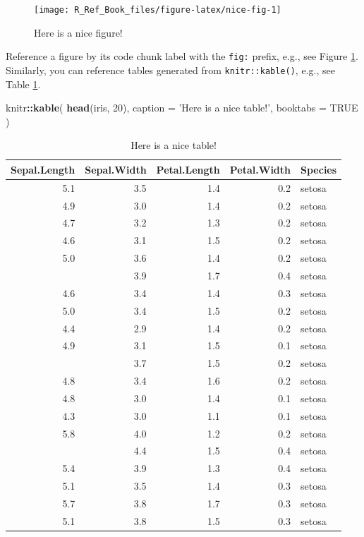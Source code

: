 \documentclass[]{book}
\newenvironment{Shaded}{\begin{snugshade}}{\end{snugshade}}
\newcommand{\KeywordTok}[1]{\textcolor[rgb]{0.13,0.29,0.53}{\textbf{#1}}}
\newcommand{\DataTypeTok}[1]{\textcolor[rgb]{0.13,0.29,0.53}{#1}}
\newcommand{\DecValTok}[1]{\textcolor[rgb]{0.00,0.00,0.81}{#1}}
\newcommand{\StringTok}[1]{\textcolor[rgb]{0.31,0.60,0.02}{#1}}
\newcommand{\OtherTok}[1]{\textcolor[rgb]{0.56,0.35,0.01}{#1}}
\newcommand{\OperatorTok}[1]{\textcolor[rgb]{0.81,0.36,0.00}{\textbf{#1}}}
\newcommand{\NormalTok}[1]{#1}
\begin{document}
\begin{figure}

{\centering \texttt{[image: R\_Ref\_Book\_files/figure-latex/nice-fig-1]} 

}

\caption{Here is a nice figure!}\label{fig:nice-fig}
\end{figure}

Reference a figure by its code chunk label with the \texttt{fig:}
prefix, e.g., see Figure \ref{fig:nice-fig}. Similarly, you can
reference tables generated from \texttt{knitr::kable()}, e.g., see Table
\ref{tab:nice-tab}.

\begin{Shaded}
\begin{Highlighting}[]
\NormalTok{knitr}\OperatorTok{::}\KeywordTok{kable}\NormalTok{(}
  \KeywordTok{head}\NormalTok{(iris, }\DecValTok{20}\NormalTok{), }\DataTypeTok{caption =} \StringTok{'Here is a nice table!'}\NormalTok{,}
  \DataTypeTok{booktabs =} \OtherTok{TRUE}
\NormalTok{)}
\end{Highlighting}
\end{Shaded}

\begin{table}

\caption{\label{tab:nice-tab}Here is a nice table!}
\centering
\begin{tabular}[t]{rrrrl}
\toprule
Sepal.Length & Sepal.Width & Petal.Length & Petal.Width & Species\\
\midrule
5.1 & 3.5 & 1.4 & 0.2 & setosa\\
4.9 & 3.0 & 1.4 & 0.2 & setosa\\
4.7 & 3.2 & 1.3 & 0.2 & setosa\\
4.6 & 3.1 & 1.5 & 0.2 & setosa\\
5.0 & 3.6 & 1.4 & 0.2 & setosa\\
\addlinespace
5.4 & 3.9 & 1.7 & 0.4 & setosa\\
4.6 & 3.4 & 1.4 & 0.3 & setosa\\
5.0 & 3.4 & 1.5 & 0.2 & setosa\\
4.4 & 2.9 & 1.4 & 0.2 & setosa\\
4.9 & 3.1 & 1.5 & 0.1 & setosa\\
\addlinespace
5.4 & 3.7 & 1.5 & 0.2 & setosa\\
4.8 & 3.4 & 1.6 & 0.2 & setosa\\
4.8 & 3.0 & 1.4 & 0.1 & setosa\\
4.3 & 3.0 & 1.1 & 0.1 & setosa\\
5.8 & 4.0 & 1.2 & 0.2 & setosa\\
\addlinespace
5.7 & 4.4 & 1.5 & 0.4 & setosa\\
5.4 & 3.9 & 1.3 & 0.4 & setosa\\
5.1 & 3.5 & 1.4 & 0.3 & setosa\\
5.7 & 3.8 & 1.7 & 0.3 & setosa\\
5.1 & 3.8 & 1.5 & 0.3 & setosa\\
\bottomrule
\end{tabular}
\end{table}
\end{document}
